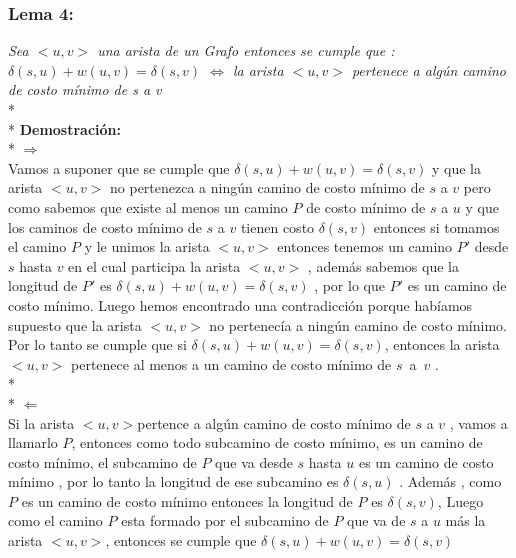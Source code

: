 \documentclass{article}
\begin{document}
     
    \subsubsection{Lema 4:}
    \textit{Sea $<u,v>$ una arista de un Grafo entonces se cumple que :\\
    $\delta\left(s,u\right) + w \left(u,v\right) = \delta\left(s,v\right)$ $\Longleftrightarrow$ la arista $<u,v>$ pertenece 
    a alg\'un camino de costo m\'inimo de s a v}
    \\*
    \\*
    \noindent \textbf{Demostraci\'on:}
    \\*
    $\Longrightarrow$\\
    Vamos a suponer que  se cumple que $\delta\left(s,u\right) + w \left(u,v\right) = \delta\left(s,v\right)$ y que la arista $<u,v>$ no pertenezca 
    a ning\'un camino de costo m\'inimo  de $s$ a $v$ pero como sabemos que existe al menos un camino $P$ de costo m\'inimo de $s$ a $u$  y que los caminos de costo m\'inimo de 
    $s$ a $v$ tienen costo $\delta\left(s,v\right)$ entonces si tomamos el camino $P$  y le unimos la arista $<u,v>$ entonces tenemos un camino $P'$ desde $s$ hasta $v$ en el cual participa la arista $<u,v>$ , 
    adem\'as sabemos que la longitud de $P'$ es $\delta\left(s,u\right) + w \left(u,v\right) = \delta\left(s,v\right)$ , por lo que $P'$ es un camino de costo m\'inimo. Luego hemos encontrado una contradicci\'on porque hab\'iamos supuesto que la 
    arista $<u,v>$ no pertenec\'ia a ning\'un camino de costo m\'inimo. Por lo tanto se cumple que si $\delta\left(s,u\right) + w \left(u,v\right) = \delta\left(s,v\right)$, entonces la arista $<u,v>$ 
    pertenece al menos a un camino de costo m\'inimo de $s$~a~$v$ . 
    \\*
    \\*
    \noindent $\Longleftarrow $\\
    Si la arista $<u,v>$pertence a alg\'un camino de costo m\'inimo de $s$ a $v$ , vamos a llamarlo $P$, entonces como todo subcamino de costo m\'inimo, 
    es un camino de costo m\'inimo, el subcamino de $P$ que va desde  $s$ hasta $u$ es un camino de costo m\'inimo , por lo tanto la longitud de ese subcamino es $\delta\left(s,u\right)$ . Adem\'as , como $P$ es  un camino de 
    costo m\'inimo entonces la longitud de $P$ es $\delta\left(s,v\right)$, Luego como el camino $P$ esta formado por el subcamino de $P$ que va de $s$ a $u$ m\'as la arista $<u,v>$, entonces se cumple que $\delta\left(s,u\right) + w\left(u,v\right) = \delta\left(s,v\right)$
\end{document}
